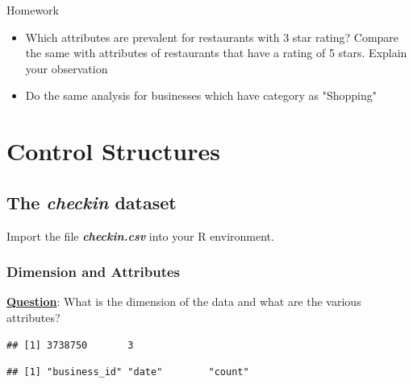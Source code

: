 \documentclass[12pt]{book}\usepackage{knitr}
\begin{document}
\begin{DIY}{Homework}
\noindent\begin{itemize}
  \item Which attributes are prevalent for restaurants with 3 star rating? Compare the same with attributes of restaurants that have a rating of 5 stars. Explain your observation
  \item Do the same analysis for businesses which have category as "Shopping" 
\end{itemize}
\end{DIY}





\newpage
\section{Control Structures}

\subsection{The \textbf{\emph{checkin}} dataset}
\noindent Import the file \emph{\textbf{checkin.csv}} into your R environment. 


\subsubsection{Dimension and Attributes}
\noindent \textbf{\underline{Question}}: What is the dimension of the data and what are the various attributes?
\begin{knitrout}
\color{fgcolor}\begin{kframe}
\begin{alltt}
\end{alltt}
\begin{verbatim}
## [1] 3738750       3
\end{verbatim}
\begin{alltt}
\end{alltt}
\begin{verbatim}
## [1] "business_id" "date"        "count"
\end{verbatim}
\begin{alltt}
\end{alltt}
\end{kframe}
\end{knitrout}
\end{document}
